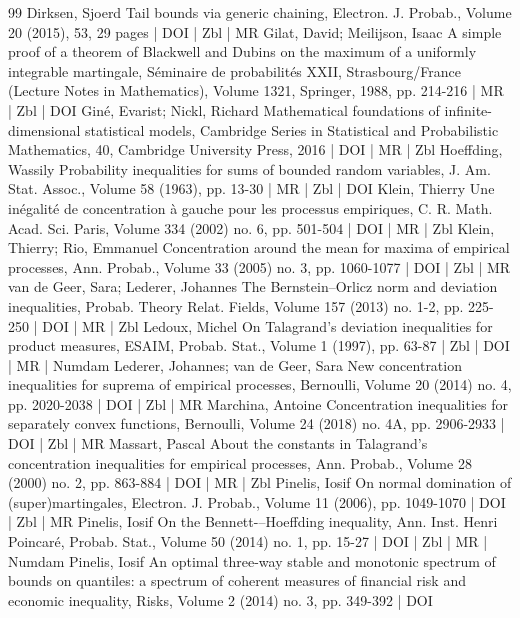 \begin{thebibliography}{99}
Dirksen, Sjoerd Tail bounds via generic chaining, Electron. J. Probab., Volume 20 (2015), 53, 29 pages | DOI | Zbl | MR
Gilat, David; Meilijson, Isaac A simple proof of a theorem of Blackwell and Dubins on the maximum of a uniformly integrable martingale, Séminaire de probabilités XXII, Strasbourg/France (Lecture Notes in Mathematics), Volume 1321, Springer, 1988, pp. 214-216 | MR | Zbl | DOI
Giné, Evarist; Nickl, Richard Mathematical foundations of infinite-dimensional statistical models, Cambridge Series in Statistical and Probabilistic Mathematics, 40, Cambridge University Press, 2016 | DOI | MR | Zbl
Hoeffding, Wassily Probability inequalities for sums of bounded random variables, J. Am. Stat. Assoc., Volume 58 (1963), pp. 13-30 | MR | Zbl | DOI
Klein, Thierry Une inégalité de concentration à gauche pour les processus empiriques, C. R. Math. Acad. Sci. Paris, Volume 334 (2002) no. 6, pp. 501-504 | DOI | MR | Zbl
Klein, Thierry; Rio, Emmanuel Concentration around the mean for maxima of empirical processes, Ann. Probab., Volume 33 (2005) no. 3, pp. 1060-1077 | DOI | Zbl | MR
van de Geer, Sara; Lederer, Johannes The Bernstein–Orlicz norm and deviation inequalities, Probab. Theory Relat. Fields, Volume 157 (2013) no. 1-2, pp. 225-250 | DOI | MR | Zbl
Ledoux, Michel On Talagrand’s deviation inequalities for product measures, ESAIM, Probab. Stat., Volume 1 (1997), pp. 63-87 | Zbl | DOI | MR | Numdam
Lederer, Johannes; van de Geer, Sara New concentration inequalities for suprema of empirical processes, Bernoulli, Volume 20 (2014) no. 4, pp. 2020-2038 | DOI | Zbl | MR
Marchina, Antoine Concentration inequalities for separately convex functions, Bernoulli, Volume 24 (2018) no. 4A, pp. 2906-2933 | DOI | Zbl | MR
Massart, Pascal About the constants in Talagrand’s concentration inequalities for empirical processes, Ann. Probab., Volume 28 (2000) no. 2, pp. 863-884 | DOI | MR | Zbl
Pinelis, Iosif On normal domination of (super)martingales, Electron. J. Probab., Volume 11 (2006), pp. 1049-1070 | DOI | Zbl | MR
Pinelis, Iosif On the Bennett-–Hoeffding inequality, Ann. Inst. Henri Poincaré, Probab. Stat., Volume 50 (2014) no. 1, pp. 15-27 | DOI | Zbl | MR | Numdam
Pinelis, Iosif An optimal three-way stable and monotonic spectrum of bounds on quantiles: a spectrum of coherent measures of financial risk and economic inequality, Risks, Volume 2 (2014) no. 3, pp. 349-392 | DOI

\end{thebibliography}
